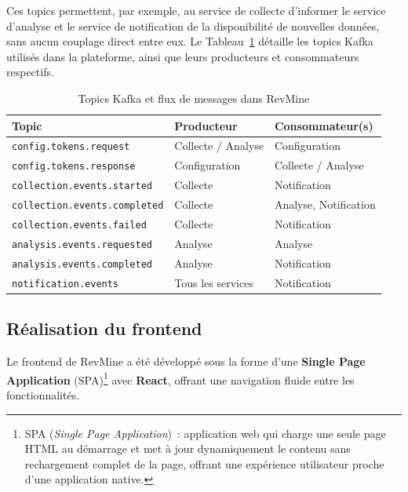 Ces topics permettent, par exemple, au service de collecte d'informer le service d'analyse et
le service de notification de la disponibilité de nouvelles données, sans aucun couplage direct
entre eux. Le Tableau~\ref{tab:kafka-topics} détaille les topics Kafka utilisés dans la
plateforme, ainsi que leurs producteurs et consommateurs respectifs.

\begin{table}[H]
\centering
\small
\caption{Topics Kafka et flux de messages dans RevMine}
\label{tab:kafka-topics}
\begin{tabular}{|>{\raggedright\arraybackslash}p{6.2cm}
                |>{\raggedright\arraybackslash}p{3cm}
                |>{\raggedright\arraybackslash}p{3.5cm}|}
\hline
\textbf{Topic} & \textbf{Producteur} & \textbf{Consommateur(s)} \\
\hline
\texttt{config.tokens.request} & Collecte / Analyse & Configuration \\
\hline
\texttt{config.tokens.response} & Configuration & Collecte / Analyse \\
\hline
\texttt{collection.events.started} & Collecte & Notification \\
\hline
\texttt{collection.events.completed} & Collecte & Analyse, Notification \\
\hline
\texttt{collection.events.failed} & Collecte & Notification \\
\hline
\texttt{analysis.events.requested} & Analyse & Analyse \\
\hline
\texttt{analysis.events.completed} & Analyse & Notification \\
\hline
\texttt{notification.events} & Tous les services & Notification \\
\hline
\end{tabular}
\end{table}

\subsection{Réalisation du frontend}

Le frontend de RevMine a été développé sous la forme d'une \textbf{Single Page Application}
(SPA)\footnote{SPA (\textit{Single Page Application})~: application web qui charge une seule
page HTML au démarrage et met à jour dynamiquement le contenu sans rechargement complet de la
page, offrant une expérience utilisateur proche d'une application native.} avec \textbf{React},
offrant une navigation fluide entre les fonctionnalités.

